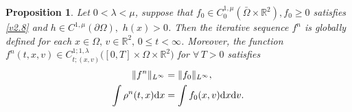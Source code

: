 \documentclass[11pt,reqno]{amsart}%
\newtheorem{Proposition}{Proposition}[section]
\theoremstyle{definition}
\theoremstyle{remark}
\begin{document}
\begin{Proposition}\label{P4}
Let  $ 0<\lambda<\mu$,
 suppose that $f_{0}\in C^{1,\mu}_{0}(\bar{\Omega}\times \mathbb{R}^{2}), f_{0}\geq 0$ satisfies \eqref{v2.8} and $h \in C^{1,\mu}(\partial\Omega),\,\,h(x)>0$.
Then the  iterative sequence $f^{n}$ is globally defined for each $x\in \Omega,\,v\in\mathbb{R}^{2},\,0\leq t<\infty $.
 Moreover,  the function $f^{n}(t,x,v)\in C^{1;1,\lambda}_{t;(x,v)}\big([0,T] \times\Omega\times\mathbb{R}^{2}\big)$  for $\forall\, T >0$ satisfies
\begin{align}
\|f^{n}\|_{L^{\infty}}&=\|f_{0}\|_{L^{\infty}} ,\label{v5.15}\\
\int \rho^{n}(t,x){\rm d}x&=\int f_{0}(x,v){\rm d}x{\rm d}v.  \label{v5.16}
\end{align}
\end{Proposition}
\end{document}

